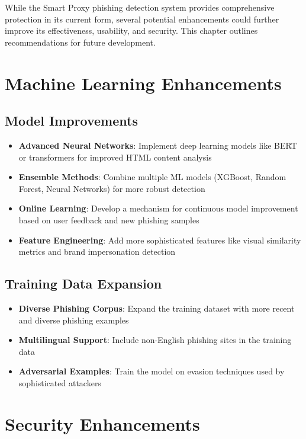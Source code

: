 While the Smart Proxy phishing detection system provides comprehensive protection in its current form, several potential enhancements could further improve its effectiveness, usability, and security. This chapter outlines recommendations for future development.

\section{Machine Learning Enhancements}

\subsection{Model Improvements}
\begin{itemize}
    \item \textbf{Advanced Neural Networks}: Implement deep learning models like BERT or transformers for improved HTML content analysis
    \item \textbf{Ensemble Methods}: Combine multiple ML models (XGBoost, Random Forest, Neural Networks) for more robust detection
    \item \textbf{Online Learning}: Develop a mechanism for continuous model improvement based on user feedback and new phishing samples
    \item \textbf{Feature Engineering}: Add more sophisticated features like visual similarity metrics and brand impersonation detection
\end{itemize}

\subsection{Training Data Expansion}
\begin{itemize}
    \item \textbf{Diverse Phishing Corpus}: Expand the training dataset with more recent and diverse phishing examples
    \item \textbf{Multilingual Support}: Include non-English phishing sites in the training data
    \item \textbf{Adversarial Examples}: Train the model on evasion techniques used by sophisticated attackers
\end{itemize}

\section{Security Enhancements}

